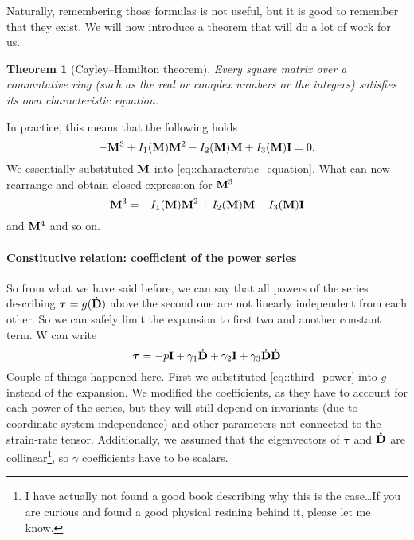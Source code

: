 \documentclass[a4paper]{article}
\newtheorem{theorem}{Theorem}
\begin{document}
Naturally, remembering those formulas is not useful, but it is good to 
remember that they exist. We will now introduce a theorem that will do 
a lot of work for us.
\begin{theorem}[Cayley–Hamilton theorem]
   Every square matrix over a commutative ring (such as the real or 
   complex numbers or the integers) satisfies its own characteristic equation.
\end{theorem}
\noindent
In practice, this means that the following holds
\begin{equation*}
  -\vb{M}^3 + I_1 \qty(\vb{M})\vb{M}^2 - I_2\qty(\vb{M})\vb{M}
  + I_3\qty(\vb{M})\vb{I} = 0.
\end{equation*}
We essentially substituted \(\vb{M}\) into \autoref{eq::characterstic_equation}.
What can now rearrange and obtain closed expression for \(\vb{M}^3\)
\begin{equation}\label{eq::third_power}
  \vb{M}^3  = - I_1 \qty(\vb{M})\vb{M}^2 + I_2\qty(\vb{M})\vb{M}
  - I_3\qty(\vb{M})\vb{I}
\end{equation}
and \(\vb{M}^4\) and so on.

\paragraph{Constitutive relation: coefficient of the power series}
So from what we have said before, we can say that all powers of the 
series describing \(\bm{\tau} = g(\dot{\vb{D}})\) above the second one
are not linearly independent from each other. So we can safely limit the 
expansion to first two and another constant term. W can write
\[
  \bm{\tau} = -p\vb{I} + \gamma_1 \vb{\dot{D}} + \gamma_2\vb{I} 
  + \gamma_3\vb{\dot{D}}\vb{\dot{D}}
\]
Couple of things happened here. First we substituted \autoref{eq::third_power}
into \(g\) instead of the expansion. We modified the coefficients, as they have
to account for each power of the series, but they will still depend on 
invariants (due to coordinate system independence) and other parameters not 
connected to the strain-rate tensor. Additionally, we assumed that the 
eigenvectors of \(\bm{\tau}\) and \(\vb{\dot{D}}\) are collinear\footnote{%
I have actually not found a good book describing why this is the case\dots If
you are curious and found a good physical resining behind it, please let me 
know.}, so \(\gamma\) coefficients have to be scalars.
\end{document}
